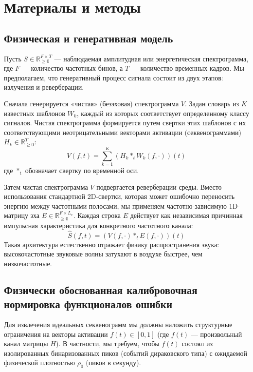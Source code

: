 \documentclass[11pt,a4paper]{article}
\begin{document}
\section{Материалы и методы}

\subsection{Физическая и генеративная модель}
Пусть $S \in \mathbb{R}_{\ge 0}^{F \times T}$ — наблюдаемая амплитудная или энергетическая спектрограмма, где $F$ — количество частотных бинов, а $T$ — количество временных кадров. Мы предполагаем, что генеративный процесс сигнала состоит из двух этапов: излучения и реверберации.

Сначала генерируется «чистая» (безэховая) спектрограмма $V$. Задан словарь из $K$ известных шаблонов $W_k$, каждый из которых соответствует определенному классу сигналов. Чистая спектрограмма формируется путем свертки этих шаблонов с их соответствующими неотрицательными векторами активации (секвенограммами) $H_k \in \mathbb{R}_{\ge 0}^{T}$:
\begin{equation}
V(f, t) = \sum_{k=1}^{K} (H_k *_{t} W_k(f, \cdot))(t)
\end{equation}
где $*_{t}$ обозначает свертку по временной оси.

Затем чистая спектрограмма $V$ подвергается реверберации среды. Вместо использования стандартной 2D-свертки, которая может ошибочно переносить энергию между частотными полосами, мы применяем частотно-зависимую 1D-матрицу эха $E \in \mathbb{R}_{\ge 0}^{F \times L_e}$. Каждая строка $E$ действует как независимая причинная импульсная характеристика для конкретного частотного канала:
\begin{equation}
\hat{S}(f, t) = (V(f, \cdot) *_{t} E(f, \cdot))(t)
\end{equation}
Такая архитектура естественно отражает физику распространения звука: высокочастотные звуковые волны затухают в воздухе быстрее, чем низкочастотные.

\subsection{Физически обоснованная калибровочная нормировка функционалов ошибки}
Для извлечения идеальных секвенограмм мы должны наложить структурные ограничения на векторы активации $f(t) \in [0,1]$ (где $f(t)$ — произвольный канал матрицы $H$). В частности, мы требуем, чтобы $f(t)$ состоял из изолированных бинаризованных пиков (событий дираковского типа) с ожидаемой физической плотностью $\rho_0$ (пиков в секунду).
\end{document}
